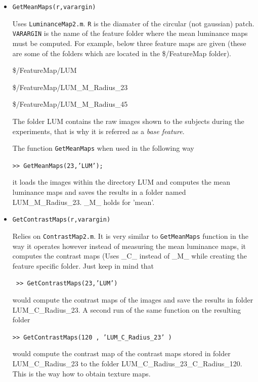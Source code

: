 \documentclass[a4paper,10pt]{report}
\begin{document}
\begin{itemize}
\item \texttt{GetMeanMaps(r,varargin)}

Uses \texttt{LuminanceMap2.m}. \texttt{R} is the diamater of the circular (not gaussian) patch. \texttt{VARARGIN} is the name of the feature folder where the mean luminance maps must be computed. For example, below three feature maps are given (these are some of the folders which are located in the \$/FeatureMap folder). 

\$/FeatureMap/LUM             

\$/FeatureMap/LUM\_M\_Radius\_23 

\$/FeatureMap/LUM\_M\_Radius\_45 
		
The folder LUM contains the raw images shown to the subjects during the experiments, that is why it is referred as a \textit{base feature}. 

The function \texttt{GetMeanMaps} when used in the following way

\texttt{>> GetMeanMaps(23,'LUM');}

it loads the images within the directory LUM and computes the mean luminance maps and saves the results in a folder named LUM\_M\_Radius\_23. \_M\_ holds for 'mean'.

\item \texttt{GetContrastMaps(r,varargin)}

Relies on \texttt{ContrastMap2.m}. It is very similar to \texttt{GetMeanMaps} function in the way it operates however instead of measuring the mean luminance maps, it computes the contrast maps (Uses \_C\_ instead of \_M\_ while creating the feature specific folder. Just keep in mind that 

		\texttt{ >> GetContrastMaps(23,'LUM')}

		would compute the contrast maps of the images and save the results in folder LUM\_C\_Radius\_23. A second run of the same function on the resulting folder 

		\texttt{>> GetContrastMaps(120 , 'LUM\_C\_Radius\_23' )}

		would compute the contrast map of the contrast maps stored in folder LUM\_C\_Radius\_23 to the folder LUM\_C\_Radius\_23\_C\_Radius\_120. This is the way how to obtain texture maps.

\end{itemize}
\end{document}
